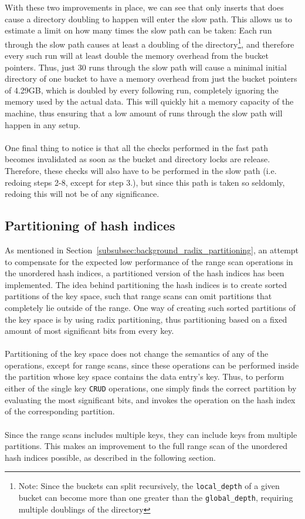 \documentclass[11pt]{article} %
\begin{document}
With these two improvements in place, we can see that only inserts that does cause a directory doubling to happen will enter the slow path. This allows us to estimate a limit on how many times the slow path can be taken: Each run through the slow path causes at least a doubling of the directory\footnote{Note: Since the buckets can split recursively, the \verb|local_depth| of a given bucket can become more than one greater than the \verb|global_depth|, requiring multiple doublings of the directory}, and therefore every such run will at least double the memory overhead from the bucket pointers. Thus, just 30 runs through the slow path will cause a minimal initial directory of one bucket to have a memory overhead from just the bucket pointers of 4.29GB, which is doubled by every following run, completely ignoring the memory used by the actual data. This will quickly hit a memory capacity of the machine, thus ensuring that a low amount of runs through the slow path will happen in any setup.\\
\\
One final thing to notice is that all the checks performed in the fast path becomes invalidated as soon as the bucket and directory locks are release. Therefore, these checks will also have to be performed in the slow path (i.e. redoing steps 2-8, except for step 3.), but since this path is taken so seldomly, redoing this will not be of any significance.
\subsection{Partitioning of hash indices}
\label{subsec:_design_partition_hash_index}
As mentioned in Section~\ref{subsubsec:background_radix_partitioning}, an attempt to compensate for the expected low performance of the range scan operations in the unordered hash indices, a partitioned version of the hash indices has been implemented. The idea behind partitioning the hash indices is to create sorted partitions of the key space, such that range scans can omit partitions that completely lie outside of the range. One way of creating such sorted partitions of the key space is by using radix partitioning, thus partitioning based on a fixed amount of most significant bits from every key. \\
\\
Partitioning of the key space does not change the semantics of any of the operations, except for range scans, since these operations can be performed inside the partition whose key space contains the data entry's key. Thus, to perform either of the single key \verb|CRUD| operations, one simply finds the correct partition by evaluating the most significant bits, and invokes the operation on the hash index of the corresponding partition.\\
\\
Since the range scans includes multiple keys, they can include keys from multiple partitions. This makes an improvement to the full range scan of the unordered hash indices possible, as described in the following section.
\end{document}
